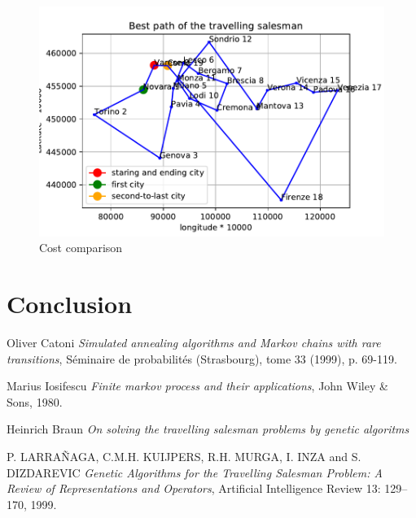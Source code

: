 \documentclass{article}
\begin{document}
\begin{figure}[H]
\includegraphics[scale=1]{../path.pdf} 
\centering
\caption{Cost comparison}
\end{figure}

\section{Conclusion}

\begin{thebibliography}{9}

Oliver Catoni
\textit{Simulated annealing algorithms and Markov chains with rare transitions}, Séminaire de probabilités (Strasbourg), tome 33 (1999), p. 69-119.

Marius Iosifescu
\textit{Finite markov process and their applications}, John Wiley \& Sons, 1980.

Heinrich Braun
\textit{On solving the travelling salesman problems by genetic algoritms}

P. LARRAÑAGA, C.M.H. KUIJPERS, R.H. MURGA, I. INZA and S. DIZDAREVIC
\textit{Genetic Algorithms for the Travelling Salesman Problem: A Review of Representations and Operators}, Artificial Intelligence Review 13: 129–170, 1999.

 
\end{thebibliography}
\end{document}
